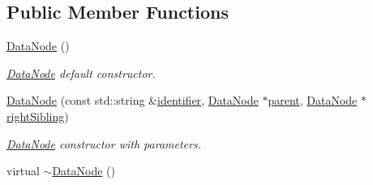 \subsection*{Public Member Functions}
\begin{DoxyCompactItemize}
\item 
\hyperlink{classDatabase_1_1DataNode_a7999f782bb0465613e703364db8cd22a}{Data\+Node} ()\hypertarget{classDatabase_1_1DataNode_a7999f782bb0465613e703364db8cd22a}{}\label{classDatabase_1_1DataNode_a7999f782bb0465613e703364db8cd22a}

\begin{DoxyCompactList}\small\item\em \hyperlink{classDatabase_1_1DataNode}{Data\+Node} default constructor. \end{DoxyCompactList}\item 
\hyperlink{classDatabase_1_1DataNode_ac7680a07b6a02dbc031bdd338b36aa1d}{Data\+Node} (const std\+::string \&\hyperlink{classDatabase_1_1DataNode_ace59a7fba9c490d2dae59c4af7b0c71f}{identifier}, \hyperlink{classDatabase_1_1DataNode}{Data\+Node} $\ast$\hyperlink{classDatabase_1_1DataNode_a8d70472d0f14aa3ae3ee74d9f3e879d6}{parent}, \hyperlink{classDatabase_1_1DataNode}{Data\+Node} $\ast$\hyperlink{classDatabase_1_1DataNode_ae335fc33c3813e8a6638d50faef44d5d}{right\+Sibling})
\begin{DoxyCompactList}\small\item\em \hyperlink{classDatabase_1_1DataNode}{Data\+Node} constructor with parameters. \end{DoxyCompactList}\item 
virtual \hyperlink{classDatabase_1_1DataNode_ac58f04cb07497c0b0028398f18f36c4f}{$\sim$\+Data\+Node} ()\hypertarget{classDatabase_1_1DataNode_ac58f04cb07497c0b0028398f18f36c4f}{}\label{classDatabase_1_1DataNode_ac58f04cb07497c0b0028398f18f36c4f}


\end{DoxyCompactItemize}
